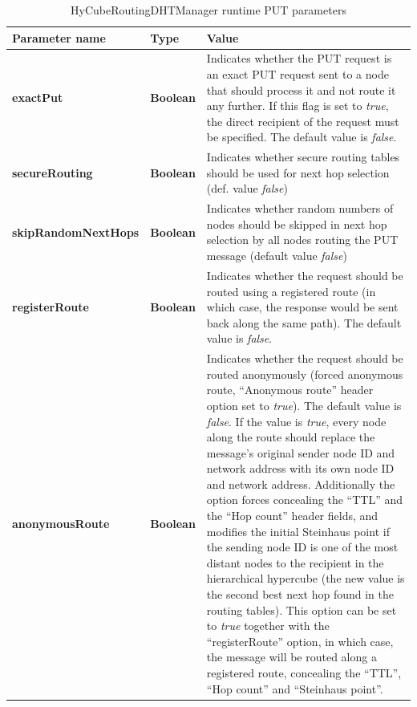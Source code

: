 \begin{table}
\scriptsize
\begin{center}
\begin{tabular}{p{2.5cm} p{1.5cm} p{10.5cm}}
	\hline
	\textbf{Parameter name}					& \textbf{Type}					& \textbf{Value}					\\[1mm]
    \hline
	\textbf{exactPut}						& \textbf{Boolean}				& Indicates whether the PUT request is an exact PUT request sent to a node that should process it and not route it any further. If this flag is set to \emph{true}, the direct recipient of the request must be specified. The default value is \emph{false}.			\\[1.5mm]
	\textbf{secureRouting}					& \textbf{Boolean}				& Indicates whether secure routing tables should be used for next hop selection (def. value \emph{false})			\\[1.5mm]
	\textbf{skipRandomNextHops}				& \textbf{Boolean}				& Indicates whether random numbers of nodes should be skipped in next hop selection by all nodes routing the PUT message (default value \emph{false})		\\[1.5mm]
	\textbf{registerRoute}					& \textbf{Boolean}				& Indicates whether the request should be routed using a registered route (in which case, the response would be sent back along the same path). The default value is \emph{false}.		\\[1.5mm]
	\textbf{anonymousRoute}					& \textbf{Boolean}				& Indicates whether the request should be routed anonymously (forced anonymous route, ``Anonymous route'' header option set to \emph{true}). The default value is \emph{false}. If the value is \emph{true}, every node along the route should replace the message's original sender node ID and network address with its own node ID and network address. Additionally the option forces concealing the ``TTL'' and the ``Hop count'' header fields, and modifies the initial Steinhaus point if the sending node ID is one of the most distant nodes to the recipient in the hierarchical hypercube (the new value is the second best next hop found in the routing tables). This option can be set to \emph{true} together with the ``registerRoute'' option, in which case, the message will be routed along a registered route, concealing the ``TTL'', ``Hop count'' and ``Steinhaus point''.		\\[1.5mm]
    \hline
\end{tabular}
\end{center}
\caption{HyCubeRoutingDHTManager runtime PUT parameters}
\label{tab:HyCubeRoutingDHTManagerPutParameters}
\end{table}

